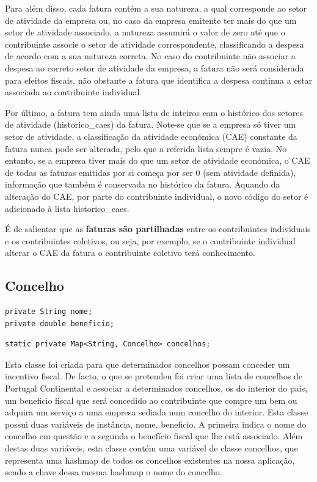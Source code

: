 \documentclass[a4paper]{article}
\begin{document}
Para além disso, cada fatura contém a sua \textsf{natureza}, a qual corresponde ao setor
de atividade da empresa ou, no caso da empresa emitente ter mais do que um setor
de atividade associado, a natureza assumirá o valor de zero até que o contribuinte
associe o setor de atividade correspondente, classificando a despesa de acordo com
a sua natureza correta.
No caso do contribuinte não associar a despesa ao correto setor de atividade da empresa,
a fatura não será considerada para efeitos fiscais, não obstante
a fatura que identifica a despesa continua a estar associada ao contribuinte individual.


Por último, a fatura tem ainda uma lista de inteiros com o histórico dos setores
de atividade (\textsf{historico\_caes}) da fatura.
Note-se que se a empresa só tiver um setor de atividade, a classificação da
atividade económica (CAE) constante da fatura nunca pode ser alterada,
pelo que a referida lista sempre é vazia.
No entanto, se a empresa tiver mais do que um setor de atividade económica,
o CAE de todas as faturas emitidas por si começa por ser 0 (sem atividade definida),
informação que também é conservada no histórico da fatura. Aquando da alteração do
CAE, por parte do contribuinte individual, o novo código do setor é adicionado
à lista \textsf{historico\_caes}.

\vspace{0.2cm}

É de salientar que as \textbf{faturas são partilhadas} entre os contribuintes individuais
e os contribuintes coletivos, ou seja, por exemplo, se o contribuinte individual
alterar o CAE da fatura o contribuinte coletivo terá conhecimento.


\subsection{Concelho}
\label{sec:concelho}

\begin{verbatim}
private String nome;
private double beneficio;
\end{verbatim}

\begin{verbatim}
static private Map<String, Concelho> concelhos;
\end{verbatim}

Esta classe foi criada para que determinados concelhos possam conceder
um incentivo fiscal. De facto, o que se pretendeu foi criar uma lista de concelhos
de Portugal Continental e associar a determinados concelhos, os do interior do
país, um beneficio fiscal que será concedido ao contribuinte
que compre um bem ou adquira um serviço a uma empresa sediada num concelho do interior.
Esta classe possui duas variáveis de instância, \textsf{nome}, \textsf{beneficio}.
A primeira indica o nome do concelho em questão e a segunda o benefício fiscal que
lhe está associado.
Além destas duas variáveis, esta classe contém uma variável de classe
\textsf{concelhos}, que representa uma hashmap de todos os concelhos existentes
na nossa aplicação, sendo a chave dessa mesma hashmap o nome do concelho.
\end{document}
